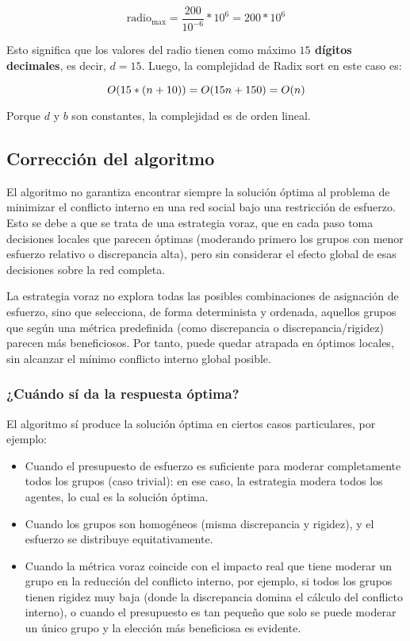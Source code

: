 \begin{equation}
	\text{radio}_{ \max } = \frac{ 200 }{ 10^{ -6 } } * 10^{ 6 } = 200 * 10^{ 6 }
\end{equation}

Esto significa que los valores del radio tienen como máximo \textbf{$15$ dígitos decimales}, es decir, $d = 15$. Luego, la complejidad de Radix sort en este caso es:

\begin{equation}
	O(15 * (n + 10)) \\
	= O(15 n + 150) \\
	= O(n)
\end{equation}

Porque $d$ y $b$ son constantes, la complejidad es de orden lineal.

\subsection{Corrección del algoritmo}

El algoritmo no garantiza encontrar siempre la solución óptima al problema de minimizar el conflicto interno en una red social bajo una restricción de esfuerzo. Esto se debe a que se trata de una estrategia voraz, que en cada paso toma decisiones locales que parecen óptimas (moderando primero los grupos con menor esfuerzo relativo o discrepancia alta), pero sin considerar el efecto global de esas decisiones sobre la red completa.

La estrategia voraz no explora todas las posibles combinaciones de asignación de esfuerzo, sino que selecciona, de forma determinista y ordenada, aquellos grupos que según una métrica predefinida (como discrepancia o discrepancia/rigidez) parecen más beneficiosos. Por tanto, puede quedar atrapada en óptimos locales, sin alcanzar el mínimo conflicto interno global posible.

\subsubsection{¿Cuándo sí da la respuesta óptima?}

El algoritmo sí produce la solución óptima en ciertos casos particulares, por ejemplo:

\begin{itemize}
	\item Cuando el presupuesto de esfuerzo es suficiente para moderar completamente todos los grupos (caso trivial): en ese caso, la estrategia modera todos los agentes, lo cual es la solución óptima.

	\item Cuando los grupos son homogéneos (misma discrepancia y rigidez), y el esfuerzo se distribuye equitativamente.

	\item Cuando la métrica voraz coincide con el impacto real que tiene moderar un grupo en la reducción del conflicto interno, por ejemplo, si todos los grupos tienen rigidez muy baja (donde la discrepancia domina el cálculo del conflicto interno), o cuando el presupuesto es tan pequeño que solo se puede moderar un único grupo y la elección más beneficiosa es evidente.
\end{itemize}


